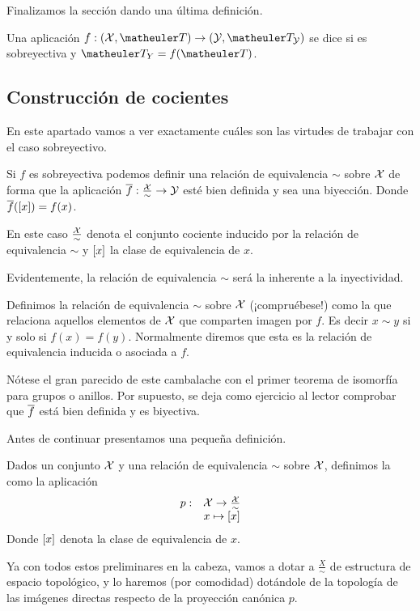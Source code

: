 Finalizamos la sección dando una última definición.
\begin{defi}[Indentificación]
	Una aplicación $f:(\X,\T)\to(\Y,\T_\Y)$ se dice  si es sobreyectiva y $\T_Y=f(\T)$.
\end{defi}
\subsection{Construcción de cocientes}
En este apartado vamos a ver exactamente cuáles son las virtudes de trabajar con el caso sobreyectivo.

Si $f$ es sobreyectiva podemos definir una relación de equivalencia $\sim$ sobre $\mathcal{X}$ de forma que la aplicación $\overline{f}:\frac{\mathcal{X}}{\sim}\to\mathcal{Y}$ esté bien definida y sea una biyección. Donde $\overline{f}(\left [ x \right ])=f(x)$.

En este caso $\frac{\mathcal{X}}{\sim}$ denota el conjunto cociente inducido por la relación de equivalencia $\sim$ y $\left [ x \right ]$ la clase de equivalencia de $x$.

Evidentemente, la relación de equivalencia $\sim$ será la inherente a la inyectividad.
\begin{defi}
	Definimos la relación de equivalencia $\sim$ sobre $\mathcal{X}$ (¡compruébese!) como la que relaciona aquellos elementos de $\mathcal{X}$ que comparten imagen por $f$. Es decir $x\sim y$ si y solo si $f(x)=f(y)$. Normalmente diremos que esta es la relación de equivalencia inducida o asociada a $f$.
\end{defi}
Nótese el gran parecido de este cambalache con el primer teorema de isomorfía para grupos o anillos. Por supuesto, se deja como ejercicio al lector comprobar que $\overline{f}$ está bien definida y es biyectiva.

Antes de continuar presentamos una pequeña definición.
\begin{defi}
	Dados un conjunto $\mathcal{X}$ y una relación de equivalencia $\sim$ sobre $\mathcal{X}$, definimos la  como la aplicación
	\[\begin{array}{cc}
	p:&\mathcal{X}\to\frac{\mathcal{X}}{\sim}\\
	&x\mapsto\left [ x \right ]
	\end{array}\]
	Donde $\left [ x \right ]$ denota la clase de equivalencia de $x$.
\end{defi}
Ya con todos estos preliminares en la cabeza, vamos a dotar a $\frac{X}{\sim}$ de estructura de espacio topológico, y lo haremos (por comodidad) dotándole de la topología de las imágenes directas respecto de la proyección canónica $p$.

